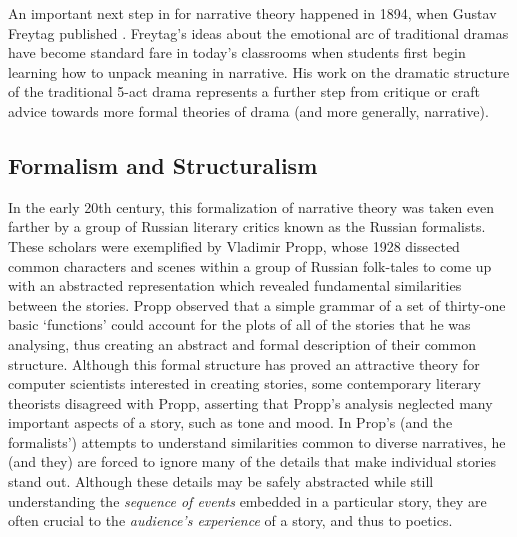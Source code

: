 An important next step in for narrative theory happened in 1894, when Gustav Freytag published  \citep{Freytag1894}.
%
Freytag's ideas about the emotional arc of traditional dramas have become standard fare in today's classrooms when students first begin learning how to unpack meaning in narrative.
%
His work on the dramatic structure of the traditional 5-act drama represents a further step from critique or craft advice towards more formal theories of drama (and more generally, narrative).


\subsection{Formalism and Structuralism}

In the early 20th century, this formalization of narrative theory was taken even farther by a group of Russian literary critics known as the Russian formalists.
%
These scholars were exemplified by Vladimir Propp, whose 1928  \citep{Propp1971} dissected common characters and scenes within a group of Russian folk-tales to come up with an abstracted representation which revealed fundamental similarities between the stories.
%
Propp observed that a simple grammar of a set of thirty-one basic `functions' could account for the plots of all of the stories that he was analysing, thus creating an abstract and formal description of their common structure.
%
Although this formal structure has proved an attractive theory for computer scientists interested in creating stories, some contemporary literary theorists disagreed with Propp, asserting that Propp's analysis neglected many important aspects of a story, such as tone and mood.
%
In Prop's (and the formalists') attempts to understand similarities common to diverse narratives, he (and they) are forced to ignore many of the details that make individual stories stand out.
%
Although these details may be safely abstracted while still understanding the \emph{sequence of events} embedded in a particular story, they are often crucial to the \emph{audience's experience} of a story, and thus to poetics.



